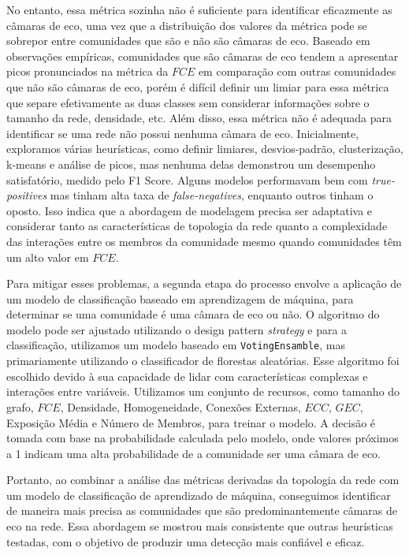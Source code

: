 No entanto, essa métrica sozinha não é suficiente para identificar eficazmente as câmaras de eco, uma vez que a distribuição dos valores da métrica pode se sobrepor entre comunidades que são e não são câmaras de eco. Baseado em observações empíricas, comunidades que são câmaras de eco tendem a apresentar picos pronunciados na métrica da $FCE$ em comparação com outras comunidades que não são câmaras de eco, porém é difícil definir um limiar para essa métrica que separe efetivamente as duas classes sem considerar informações sobre o tamanho da rede, densidade, etc. Além disso, essa métrica não é adequada para identificar se uma rede não possui nenhuma câmara de eco. Inicialmente, exploramos várias heurísticas, como definir limiares, desvios-padrão, clusterização, k-means e análise de picos, mas nenhuma delas demonstrou um desempenho satisfatório, medido pelo F1 Score. Alguns modelos performavam bem com \textit{true-positives} mas tinham alta taxa de \textit{false-negatives}, enquanto outros tinham o oposto. Isso indica que a abordagem de modelagem precisa ser adaptativa e considerar tanto as características de topologia da rede quanto a complexidade das interações entre os membros da comunidade mesmo quando comunidades têm um alto valor em $FCE$.

Para mitigar esses problemas, a segunda etapa do processo envolve a aplicação de um modelo de classificação baseado em aprendizagem de máquina, para determinar se uma comunidade é uma câmara de eco ou não. O algoritmo do modelo pode ser ajustado utilizando o design pattern \textit{strategy} e para a classificação, utilizamos um modelo baseado em \texttt{VotingEnsamble}, mas primariamente utilizando o classificador de florestas aleatórias. Esse algoritmo foi escolhido devido à sua capacidade de lidar com características complexas e interações entre variáveis. Utilizamos um conjunto de recursos, como tamanho do grafo, $FCE$, Densidade, Homogeneidade, Conexões Externas, $ECC$, $GEC$, Exposição Média e Número de Membros, para treinar o modelo. A decisão é tomada com base na probabilidade calculada pelo modelo, onde valores próximos a 1 indicam uma alta probabilidade de a comunidade ser uma câmara de eco.

Portanto, ao combinar a análise das métricas derivadas da topologia da rede com um modelo de classificação de aprendizado de máquina, conseguimos identificar de maneira mais precisa as comunidades que são predominantemente câmaras de eco na rede. Essa abordagem se mostrou mais consistente que outras heurísticas testadas, com o objetivo de produzir uma detecção mais confiável e eficaz.

